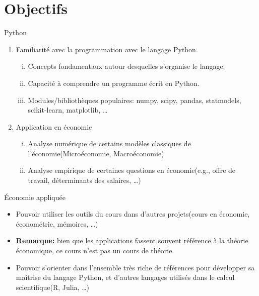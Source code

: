 \begin{frame}
\titlepage
\end{frame}



\section{Objectifs}
\frame{\sectionpage}

\begin{frame}[allowframebreaks]{Python}
\begin{enumerate}
    \item Familiarité avec la programmation avec le langage Python.
    \begin{enumerate}[(i)]
        \item Concepts fondamentaux autour desquelles s'organise le langage.
        \item Capacité à comprendre un programme écrit en Python.
        \item Modules/bibliothèques populaires: numpy, scipy, pandas, statmodels, scikit-learn, matplotlib, \ldots
    \end{enumerate}
    \item Application en économie
    \begin{enumerate}[(i)]
        \item Analyse numérique de certains modèles classiques de l'économie(Microéconomie, Macroéconomie)
        \item Analyse empirique de certaines questions en économie(e.g., offre de travail, déterminants des salaires, \ldots)
    \end{enumerate}
\end{enumerate}
\end{frame}

\begin{frame}[allowframebreaks]{\'Economie appliquée}
    \begin{itemize}
        \item Pouvoir utiliser les outils du cours dans d'autres projets(cours en économie, économétrie, mémoires, \ldots)
        \item \underline{\textbf{Remarque:}} bien que les applications fassent souvent référence à la théorie économique,
         ce cours n'est pas un cours de théorie.
         \item Pouvoir s'orienter dans l'ensemble très riche de références pour développer sa maîtrise du langage Python, 
         et d'autres langages utilisés dans le calcul scientifique(R, Julia, \ldots)
    \end{itemize}
\end{frame}

